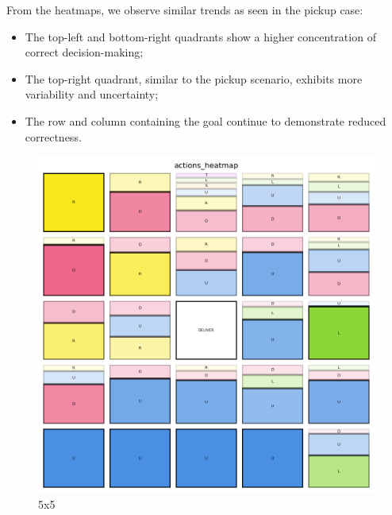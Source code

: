 From the heatmaps, we observe similar trends as seen in the pickup case:
\begin{itemize}
  \item The top-left and bottom-right quadrants show a higher concentration of correct
    decision-making;

  \item The top-right quadrant, similar to the pickup scenario, exhibits more variability
    and uncertainty;

  \item The row and column containing the goal continue to demonstrate reduced correctness.
\end{itemize}

\vspace{5mm}
\begin{figure}[h!]
  \centering
  \begin{minipage}[b]{0.32\textwidth}
    \centering
    \includegraphics[width=\textwidth]{
      images/results_discussion/stateless/hm_5x5_deliver.png
    }
    \caption{5x5}
    \label{fig:hm_5x5_deliver}
  \end{minipage}
  \hfill
  \begin{minipage}[b]{0.32\textwidth}
    \centering

\end{minipage}
\end{figure}
